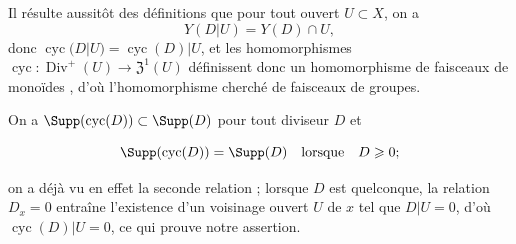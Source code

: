 Il résulte aussitôt des définitions que pour tout ouvert $U\subset X$, on a
\[
  Y(D|U)=Y(D)\cap U,
\]
donc $\operatorname{cyc}(D|U)=\operatorname{cyc}(D)|U$, et les homomorphismes $\operatorname{cyc}:\operatorname{Div}^+(U)\to\mathfrak{Z}^1(U)$ définissent donc un homomorphisme de faisceaux de monoïdes , d'où l'homomorphisme cherché  de faisceaux de groupes.

On a $\Supp(\operatorname{cyc}(D))\subset\Supp(D)$ pour tout diviseur $D$ et
\begin{env}[21.6.6.2]
\label{IV.21.6.6.2}
\[
  \Supp(\operatorname{cyc}(D))=\Supp(D)\quad\text{lorsque}\quad D\geq0;
\]
\end{env}
on a déjà vu en effet la seconde relation ;
lorsque $D$ est quelconque, la relation $D_x=0$ entraîne l'existence d'un voisinage ouvert $U$ de $x$ tel que $D|U=0$, d'où $\operatorname{cyc}(D)|U=0$, ce qui prouve notre assertion.

